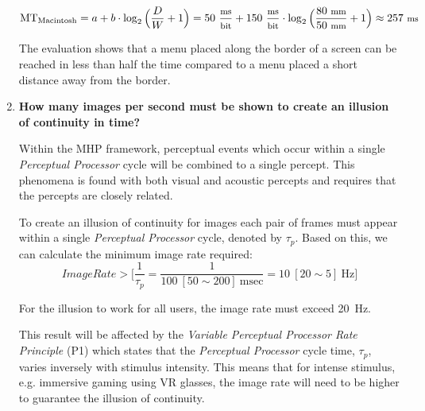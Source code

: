 \begin{enumerate}[resume*]
\begin{displaymath}
\text{MT}_\text{Macintosh} = a + b \cdot \log_2\Big(\frac{D}{W} + 1\Big) = 50~{\footnotesize \frac{\text{ms}}{\text{bit}}} + 150~{\footnotesize \frac{\text{ms}}{\text{bit}}} \cdot \log_2\Big(\frac{80~\text{\footnotesize mm}}{50~\text{\footnotesize mm}} + 1\Big) \approx 257~\text{\footnotesize ms}
\end{displaymath}

The evaluation shows that a menu placed along the border of a screen can be reached in less than half the time compared to a menu placed a short distance away from the border.

\clearpage

\item \textbf{How many images per second must be shown to create an illusion of continuity in time?}

Within the \ac{MHP} framework, perceptual events which occur within a single \textit{Perceptual Processor} cycle will be combined to a single percept. This phenomena is found with both visual and acoustic percepts and requires that the percepts are closely related.

To create an illusion of continuity for images each pair of frames must appear within a single \textit{Perceptual Processor} cycle, denoted by $\tau_p$. Based on this, we can calculate the minimum image rate required:
\begin{displaymath}
\textit{ImageRate} > \Bigg[ \frac{1}{\tau_p} = \frac{1}{100~[50 \sim 200]~\text{msec}} = 10~[20 \sim 5]~\text{Hz} \Bigg]
\end{displaymath}

For the illusion to work for all users, the image rate must exceed 20~Hz.

This result will be affected by the \textit{Variable Perceptual Processor Rate Principle} (P1) which states that the \textit{Perceptual Processor} cycle time, $\tau_p$, varies inversely with stimulus intensity. This means that for intense stimulus, e.g. immersive gaming using \ac{VR} glasses, the image rate will need to be higher to guarantee the illusion of continuity.
\end{enumerate}


